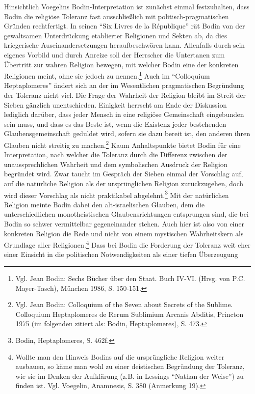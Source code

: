 Hinsichtlich Voegelins Bodin-Interpretation ist zunächst einmal festzuhalten,
dass Bodin die religiöse Toleranz fast ausschließlich mit
politisch-pragmatischen Gründen rechtfertigt.  In seinen "`Six Livres de la
République"' rät Bodin von der gewaltsamen Unterdrückung etablierter
Religionen und Sekten ab, da dies kriegerische Auseinandersetzungen
heraufbeschwören kann. Allenfalls durch sein eigenes Vorbild und durch Anreize
soll der Herrscher die Untertanen zum Übertritt zur wahren Religion bewegen,
mit welcher Bodin eine der konkreten Religionen meint, ohne sie jedoch zu
nennen.\footnote{Vgl. Jean Bodin: Sechs Bücher über den Staat. Buch IV-VI.
  (Hrsg. von P.C. Mayer-Tasch), München 1986, S. 150-151.} Auch im
"`Colloquium Heptaplomeres"' ändert sich an der im Wesentlichen pragmatischen
Begründung der Toleranz nicht viel. Die Frage der Wahrheit der Religion bleibt
im Streit der Sieben gänzlich unentschieden.  Einigkeit herrscht am Ende der
Diskussion lediglich darüber, dass jeder Mensch in eine religiöse Gemeinschaft
eingebunden sein muss, und dass es das Beste ist, wenn die Existenz jeder
bestehenden Glaubensgemeinschaft geduldet wird, sofern sie dazu bereit ist,
den anderen ihren Glauben nicht streitig zu machen.\footnote{Vgl. Jean Bodin:
  Colloquium of the Seven about Secrets of the Sublime.  Colloquium
  Heptaplomeres de Rerum Sublimium Arcanis Abditis, Princton 1975 (im
  folgenden zitiert als: Bodin, Heptaplomeres), S. 473.} Kaum Anhaltspunkte
bietet Bodin für eine Interpretation, nach welcher die Toleranz durch die
Differenz zwischen der unaussprechlichen Wahrheit und dem symbolischen
Ausdruck der Religion begründet wird. Zwar taucht im Gespräch der Sieben
einmal der Vorschlag auf, auf die natürliche Religion als der ursprünglichen
Religion zurückzugehen, doch wird dieser Vorschlag als nicht praktikabel
abgelehnt.\footnote{Bodin, Heptaplomeres, S. 462f.} Mit der natürlichen
Religion meinte Bodin dabei den alt-israelischen Glauben, dem die
unterschiedlichen monotheistischen Glaubensrichtungen entsprungen sind, die
bei Bodin so schwer vermittelbar gegeneinander stehen. Auch hier ist also von
einer konkreten Religion die Rede und nicht von einem mystischen Wahrheitskern
als Grundlage aller Religionen.\footnote{Wollte man den Hinweis Bodins auf die
  ursprüngliche Religion weiter ausbauen, so käme man wohl zu einer
  deistischen Begründung der Toleranz, wie sie im Denken der Aufklärung (z.B.
  in Lessings "`Nathan der Weise"') zu finden ist. Vgl. Voegelin, Anamnesis,
  S. 380 (Anmerkung 19).}  Dass bei Bodin die Forderung der Toleranz weit eher
einer Einsicht in die politischen Notwendigkeiten als einer tiefen Überzeugung
